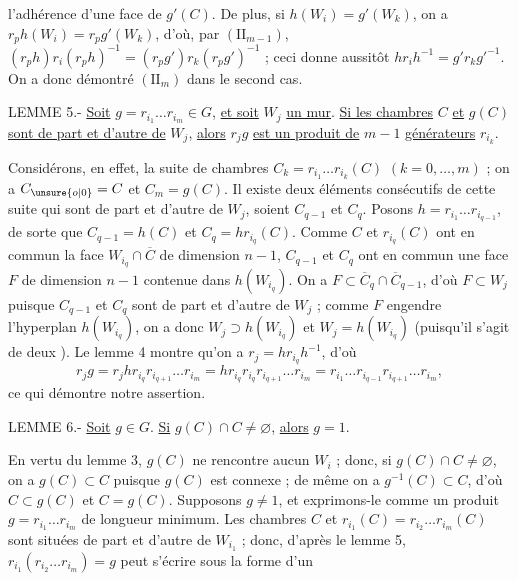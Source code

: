 l'adhérence d'une face de $g'(C)$. De plus, si $h(W_i)=g'(W_k)$, on a $r_p h(W_i)=r_p g'(W_k)$, d'où, par $(\mathrm{II}_{m-1})$, $(r_p h)r_i(r_p h)^{-1}=(r_p g')r_k(r_p g')^{-1}$ ; ceci donne aussitôt $hr_i h^{-1}=g'r_k g'^{-1}$. On a donc démontré $(\mathrm{II}_m)$ dans le second cas.

LEMME 5.- \uline{Soit} $g=r_{i_1}\ldots r_{i_m}\in G$, \uline{et soit} $W_j$ \uline{un mur}. \uline{Si les chambres} $C$ \uline{et} $g(C)$ \uline{sont de part et d'autre de} $W_j$, \uline{alors} $r_j g$ \uline{est un produit de} $m-1$ \uline{générateurs} $r_{i_k}$.

Considérons, en effet, la suite de chambres $C_k=r_{i_1}\ldots r_{i_k}(C)$ $(k=0,\ldots,m)$ ; on a $C_{\unsure{o|0}}=C$ et $C_m=g(C)$. Il existe deux éléments consécutifs de cette suite qui sont de part et d'autre de $W_j$, soient $C_{q-1}$ et $C_q$. Posons $h=r_{i_1}\ldots r_{i_{q-1}}$, de sorte que $C_{q-1}=h(C)$ et $C_q=hr_{i_q}(C)$. Comme $C$ et $r_{i_q}(C)$ ont en commun la face $W_{i_q}\cap\overline C$ de dimension $n-1$, $C_{q-1}$ et $C_q$ ont en commun une face $F$ de dimension $n-1$ contenue dans $h(W_{i_q})$. On a $F\subset\overline C_q\cap\overline C_{q-1}$, d'où $F\subset W_j$ puisque $C_{q-1}$ et $C_q$ sont de part et d'autre de $W_j$ ; comme $F$ engendre l'hyperplan $h(W_{i_q})$, on a donc $W_j\supset h(W_{i_q})$ et $W_j=h(W_{i_q})$ (puisqu'il s'agit de deux ). Le lemme 4 montre qu'on a $r_j=hr_{i_q}h^{-1}$, d'où
\[
r_jg=r_jhr_{i_q}r_{i_{q+1}}\ldots r_{i_m}
=hr_{i_q}r_{i_q}r_{i_{q+1}}\ldots r_{i_m}
=r_{i_1}\ldots r_{i_{q-1}}r_{i_{q+1}}\ldots r_{i_m},
\]
ce qui démontre notre assertion.

LEMME 6.- \uline{Soit} $g\in G$. \uline{Si} $g(C)\cap C\ne\varnothing$, \uline{alors} $g=1$.

En vertu du lemme 3, $g(C)$ ne rencontre aucun $W_i$ ; donc, si $g(C)\cap C\ne\varnothing$, on a $g(C)\subset C$ puisque $g(C)$ est connexe ; de même on a $g^{-1}(C)\subset C$, d'où $C\subset g(C)$ et $C=g(C)$. Supposons $g\ne1$, et exprimons-le comme un produit $g=r_{i_1}\ldots r_{i_m}$ de longueur minimum. Les chambres $C$ et $r_{i_1}(C)=r_{i_2}\ldots r_{i_m}(C)$ sont situées de part et d'autre de $W_{i_1}$ ; donc, d'après le lemme 5, $r_{i_1}(r_{i_2}\ldots r_{i_m})=g$ peut s'écrire sous la forme d'un
